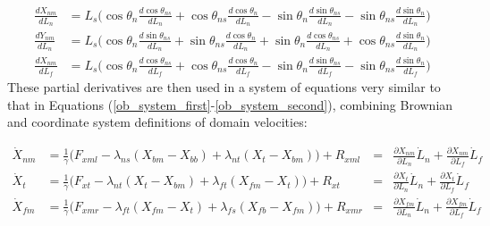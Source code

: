\documentclass[9pt,twoside,lineno]{pnas-new}
\begin{document}
\begin{align}
  \frac{dX_{nm}}{dL_n} &= L_s\Big(\cos\theta_n\frac{d\cos\theta_{ns}}{dL_n} + \cos\theta_{ns}\frac{d\cos\theta_{n}}{dL_n} - \sin\theta_n\frac{d\sin\theta_{ns}}{dL_n} - \sin\theta_{ns}\frac{d\sin\theta_{n}}{dL_n}\Big)\\
  \frac{dY_{nm}}{dL_n} &= L_s\Big(\cos\theta_n\frac{d\sin\theta_{ns}}{dL_n} + \sin\theta_{ns}\frac{d\cos\theta_{n}}{dL_n} + \sin\theta_n\frac{d\cos\theta_{ns}}{dL_n} + \cos\theta_{ns}\frac{d\sin\theta_{n}}{dL_n} \Big)\\
  \frac{dX_{nm}}{dL_f} &= L_s\Big(\cos\theta_n\frac{d\cos\theta_{ns}}{dL_f} + \cos\theta_{ns}\frac{d\cos\theta_{n}}{dL_f} - \sin\theta_n\frac{d\sin\theta_{ns}}{dL_f} - \sin\theta_{ns}\frac{d\sin\theta_{n}}{dL_f} \Big)
\end{align}
%
These partial derivatives are then used in a system of equations very similar to that in Equations (\ref{ob_system_first}-\ref{ob_system_second}), combining Brownian and coordinate system definitions of domain velocities:

\begin{align}
  \dot{X}_{nm} &= \frac{1}{\gamma} \Big(F_{xml} - \lambda_{ns}(X_{bm} - X_{bb})
  + \lambda_{nt}(X_{t } - X_{bm}) \Big) + R_{xml}
  &=& \frac{\partial X_{nm}}{\partial L_n}\dot{L}_n + \frac{\partial X_{nm}}{\partial L_f}\dot{L}_f\\
  \dot{X}_{t } &= \frac{1}{\gamma} \Big(F_{xt } - \lambda_{nt}(X_{t } - X_{bm})
  + \lambda_{ft}(X_{fm} - X_{t }) \Big) + R_{xt }
  &=& \frac{\partial X_{t}}{\partial L_n}\dot{L}_n + \frac{\partial X_{t}}{\partial L_f}\dot{L}_f\\
  \dot{X}_{fm} &= \frac{1}{\gamma} \Big(F_{xmr} - \lambda_{ft}(X_{fm} - X_{t })
  + \lambda_{fs}(X_{fb} - X_{fm}) \Big) + R_{xmr}
  &=& \frac{\partial X_{fm}}{\partial L_n}\dot{L}_n + \frac{\partial X_{fm}}{\partial L_f}\dot{L}_f
\end{align}
\end{document}
